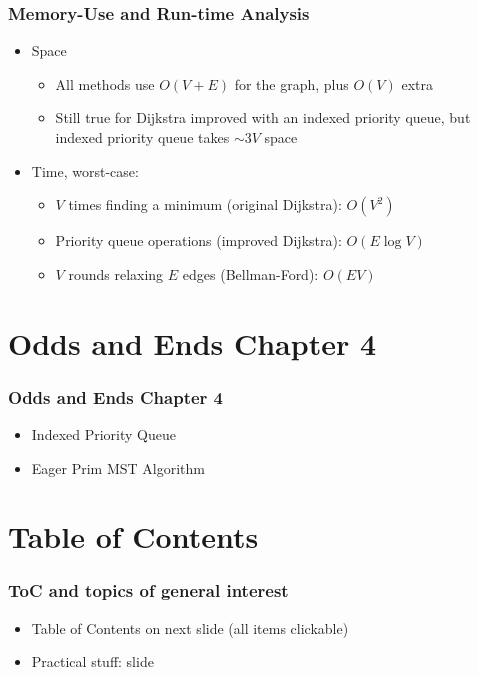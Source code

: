 \documentclass[handout]{beamer}
\begin{document}
\begin{frame}
    \frametitle{Memory-Use and Run-time Analysis}
\begin{itemize}[<+->] \item Space
\begin{itemize}[<+->]
\item All methods use $O(V+E)$ for the graph, plus $O(V)$ extra 
\item Still true for Dijkstra improved with an indexed priority queue,
but indexed priority queue takes $\sim 3V$ space
\end{itemize} 
\item Time, worst-case:
\begin{itemize}[<+->]
\item $V$ times finding a minimum (original Dijkstra): $O(V^2)$ 
\item Priority queue operations (improved Dijkstra): $O(E\log V)$
\item $V$ rounds relaxing $E$ edges (Bellman-Ford): $O(EV)$ 
\end{itemize}
\end{itemize} 
\end{frame}



\section{Odds and Ends Chapter 4}

\begin{frame}
    \frametitle{Odds and Ends Chapter 4}

\begin{itemize}[<+->]
\item Indexed Priority Queue
\item Eager Prim MST Algorithm
\end{itemize}
\end{frame}


\section{Table of Contents}

\begin{frame}%
    
    \frametitle{ToC and topics of general interest}

 \begin{itemize}[<+->]\label{contentstable}
    \item Table of Contents on next slide (all items clickable)
    \item Practical stuff: slide \hyperlink{practicalstuff}{\color{red}{\pageref{practicalstuff}}}
 \end{itemize}

\end{frame}


\begin{multicols}{2}
\tableofcontents %
\end{multicols}
\end{document}
